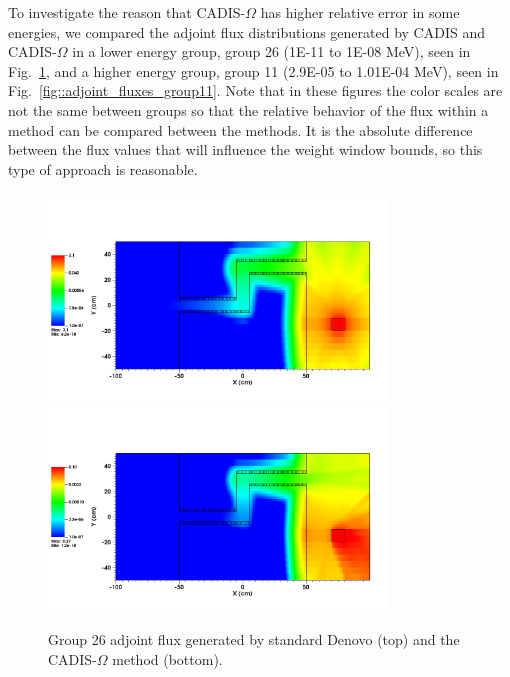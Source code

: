 \documentclass[12pt]{article}
\begin{document}
To investigate the reason that CADIS-$\Omega$ has higher relative error in some energies, we compared the adjoint flux distributions generated by CADIS and CADIS-$\Omega$ in a lower energy group, group 26 (1E-11 to 1E-08 MeV), seen in Fig.~\ref{fig::adjoint_fluxes_group26}, and a higher energy group, group 11 (2.9E-05 to 1.01E-04 MeV), seen in Fig.~\ref{fig::adjoint_fluxes_group11}.
Note that in these figures the color scales are not the same between groups so that the relative behavior of the flux within a method can be compared between the methods. It is the absolute difference between the flux values that will influence the weight window bounds, so this type of approach is reasonable. 

\begin{figure}
  \begin{center}
    \includegraphics[width=0.80\textwidth]{./images/maze2_adjoint_group26_adjusted.png}
    \includegraphics[width=0.80\textwidth]{./images/maze2_myflux_group26_adjusted.png}
    \caption[]{\label{fig::adjoint_fluxes_group26} Group 26 adjoint flux generated by standard Denovo (top) and the CADIS-$\Omega$ method (bottom).}
  \end{center}
\end{figure}
\end{document}
